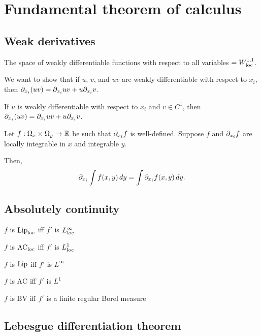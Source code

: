 \documentclass{../note}
\begin{document}
\part{Fundamental theorem of calculus}

\chapter{Weak derivatives}

The space of weakly differentiable functions with respect to all variables $=W_{\mathrm{loc}}^{1,1}$.

\begin{prb}
We want to show that if $u$, $v$, and $uv$ are weakly differentiable with respect to $x_i$, then $\pd_{x_i}(uv)=\pd_{x_i}uv+u\pd_{x_i}v$.
\begin{parts}
\item If $u$ is weakly differentiable with respect to $x_i$ and $v\in C^1$, then $\pd_{x_i}(uv)=\pd_{x_i}uv+u\pd_{x_i}v$.
\end{parts}
\end{prb}


\begin{prb}
Let $f:\Omega_x\times\Omega_y\to\mathbb{R}$ be such that $\pd_{x_i}f$ is well-defined. Suppose $f$ and $\pd_{x_i}f$ are locally integrable in $x$ and integrable $y$.

Then,
\[\pd_{x_i}\int f(x,y)\,dy=\int\pd_{x_i}f(x,y)\,dy.\]
\end{prb}





\chapter{Absolutely continuity}

\begin{parts}
\item $f$ is $\operatorname{Lip}_{\mathrm{loc}}$ iff $f'$ is $L_{\mathrm{loc}}^\infty$
\item $f$ is $\textrm{AC}_{\mathrm{loc}}$ iff $f'$ is $L_{\mathrm{loc}}^1$
\end{parts}
\begin{parts}
\item $f$ is $\operatorname{Lip}$ iff $f'$ is $L^\infty$
\item $f$ is $\textrm{AC}$ iff $f'$ is $L^1$
\item $f$ is $\textrm{BV}$ iff $f'$ is a finite regular Borel measure
\end{parts}



\chapter{Lebesgue differentiation theorem}
\end{document}
